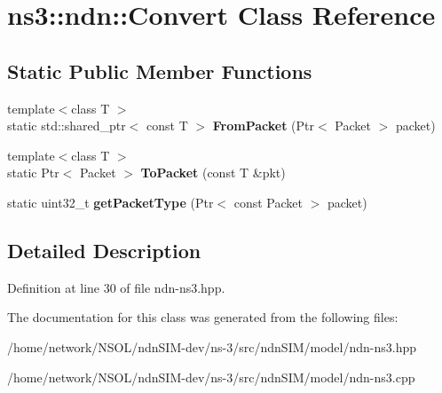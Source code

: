 \hypertarget{classns3_1_1ndn_1_1Convert}{}\section{ns3\+:\+:ndn\+:\+:Convert Class Reference}
\label{classns3_1_1ndn_1_1Convert}
\subsection*{Static Public Member Functions}
\begin{DoxyCompactItemize}
\item 
{\footnotesize template$<$class T $>$ }\\static std\+::shared\+\_\+ptr$<$ const T $>$ {\bfseries From\+Packet} (Ptr$<$ Packet $>$ packet)\hypertarget{classns3_1_1ndn_1_1Convert_aeea9709c352bf5d3c8aca59f7afbeef5}{}\label{classns3_1_1ndn_1_1Convert_aeea9709c352bf5d3c8aca59f7afbeef5}

\item 
{\footnotesize template$<$class T $>$ }\\static Ptr$<$ Packet $>$ {\bfseries To\+Packet} (const T \&pkt)\hypertarget{classns3_1_1ndn_1_1Convert_a87be29da30cbd503ca06f942636a8269}{}\label{classns3_1_1ndn_1_1Convert_a87be29da30cbd503ca06f942636a8269}

\item 
static uint32\+\_\+t {\bfseries get\+Packet\+Type} (Ptr$<$ const Packet $>$ packet)\hypertarget{classns3_1_1ndn_1_1Convert_a7279b289650b67f001e03394cb26d607}{}\label{classns3_1_1ndn_1_1Convert_a7279b289650b67f001e03394cb26d607}

\end{DoxyCompactItemize}


\subsection{Detailed Description}


Definition at line 30 of file ndn-\/ns3.\+hpp.



The documentation for this class was generated from the following files\+:\begin{DoxyCompactItemize}
\item 
/home/network/\+N\+S\+O\+L/ndn\+S\+I\+M-\/dev/ns-\/3/src/ndn\+S\+I\+M/model/ndn-\/ns3.\+hpp\item 
/home/network/\+N\+S\+O\+L/ndn\+S\+I\+M-\/dev/ns-\/3/src/ndn\+S\+I\+M/model/ndn-\/ns3.\+cpp\end{DoxyCompactItemize}

